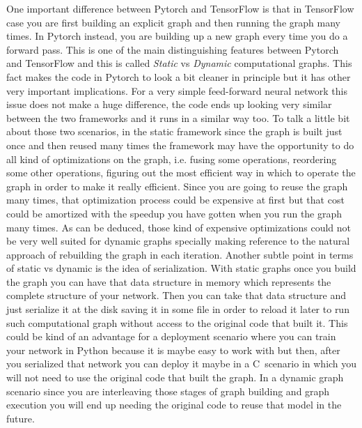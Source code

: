 \documentclass[11pt,a4paper]{article}
\newcommand{\CC}{C\nolinebreak\hspace{-.05em}\raisebox{.4ex}{\tiny\bf +}\nolinebreak\hspace{-.10em}\raisebox{.4ex}{\tiny\bf +}}
\begin{document}
One important difference between Pytorch and TensorFlow is that in TensorFlow case you are first building an explicit graph and then running the graph many times. In Pytorch instead, you are building up a new graph every time you do a forward pass. This is one of the main distinguishing features between Pytorch and TensorFlow and this is called \emph{Static} vs \emph{Dynamic} computational graphs. This fact makes the code in Pytorch to look a bit cleaner in principle but it has other very important implications. For a very simple feed-forward neural network this issue does not make a huge difference, the code ends up looking very similar between the two frameworks and it runs in a similar way too. To talk a little bit about those two scenarios, in the static framework since the graph is built just once and then reused many times the framework may have the opportunity to do all kind of optimizations on the graph, i.e. fusing some operations, reordering some other operations, figuring out the most efficient way in which to operate the graph in order to make it really efficient. Since you are going to reuse the graph many times, that optimization process could be expensive at first but that cost could be amortized with the speedup you have gotten when you run the graph many times. As can be deduced, those kind of expensive optimizations could not be very well suited for dynamic graphs specially making reference to the natural approach of rebuilding the graph in each iteration. Another subtle point in terms of static vs dynamic is the idea of serialization. With static graphs once you build the graph you can have that data structure in memory which represents the complete structure of your network. Then you can take that data structure and just serialize it at the disk saving it in some file in order to reload it later to run such computational graph without access to the original code that built it. This could be kind of an advantage for a deployment scenario where you can train your network in Python because it is maybe easy to work with but then, after you serialized that network you can deploy it maybe in a \CC~scenario in which you will not need to use the original code that built the graph. In a dynamic graph scenario since you are interleaving those stages of graph building and graph execution you will end up needing the original code to reuse that model in the future.
\end{document}
